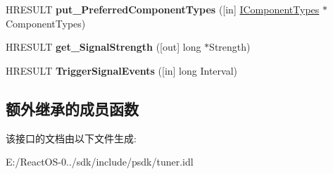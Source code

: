 \begin{DoxyCompactItemize}
\item 
\mbox{\label{interface_i_tuner_a6bb9a4a3d6c7e4869c2fc3eaf255802e}} 
H\+R\+E\+S\+U\+LT {\bfseries put\+\_\+\+Preferred\+Component\+Types} (\mbox{[}in\mbox{]} \hyperlink{interface_i_component_types}{I\+Component\+Types} $\ast$Component\+Types)
\item 
\mbox{\label{interface_i_tuner_a72d3c968c200f460f0728ac836d519fa}} 
H\+R\+E\+S\+U\+LT {\bfseries get\+\_\+\+Signal\+Strength} (\mbox{[}out\mbox{]} long $\ast$Strength)
\item 
\mbox{\label{interface_i_tuner_a726c50bbfb805db377a0919b92b6056c}} 
H\+R\+E\+S\+U\+LT {\bfseries Trigger\+Signal\+Events} (\mbox{[}in\mbox{]} long Interval)
\end{DoxyCompactItemize}
\subsection*{额外继承的成员函数}


该接口的文档由以下文件生成\+:\begin{DoxyCompactItemize}
\item 
E\+:/\+React\+O\+S-\/0../sdk/include/psdk/tuner.\+idl\end{DoxyCompactItemize}
